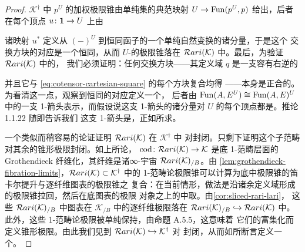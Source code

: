 \begin{proof}
$\mathcal{K}^{\dagger}$ 中\trCotensor{} $p^{U}$ 的加权极限锥由单纯集的典范映射
$U\to\operatorname{Fun}(p^{U},p)$
给出，后者在每个顶点 $u\colon\mathbf{1}\to U$ 上由
\begin{rveq}\label{eq:cotensor-cartesian-square}
\end{rveq}
诸映射 $u^{*}$ 定义从 $(-)^{U}$ 到恒同函子的一个单纯自然变换的诸分量，于是这个
交换方块的对应是一个恒同，从而 $U$-\trCotensor{}的极限锥落在 $\mathcal{R}ari(\mathcal{K})$
中。最后，为验证 $\mathcal{R}ari(\mathcal{K})$ 中\trCotensor{}的\trUniversalProperty{}，
我们必须证明：任何交换方块——其定义域 $q$ 是一支容有\trRightAdjoint{}右逆的%
\trIsofibration
\begin{center}
\end{center}
并且它与 \eqref{eq:cotensor-cartesian-square} 的每个方块复合均得\trExactSquare
——本身是正合的。为看清这一点，观察到恒同的对应定义一个\trNaturalTransformation{}，
后者由 $\operatorname{Fun}(A,E^{U})\cong\operatorname{Fun}(A,E)^{U}$ 中的一支 1-箭头表示，而假设说这支
1-箭头的诸分量对 $U$ 的每个顶点都是\trInvertible{}。推论 1.1.22 随即告诉我们
这支 1-箭头是\trInvertible{}，正如所求。

一个类似而稍容易的论证证明 $\mathcal{R}ari(\mathcal{K})$ 在 $\mathcal{K}^{\dagger}$ 中
对\trProduct{}封闭。只剩下证明这个子范畴对其余的锥形极限封闭。如上所论，
$\mathrm{cod}\colon\mathcal{R}ari(\mathcal{K})\to\mathcal{K}$ 是底 1-范畴层面的
Grothendieck 纤维化，其纤维是诸∞-宇宙 $\mathcal{R}ari(\mathcal{K})_{/B}$。由
\cref{lem:grothendieck-fibration-limits}，$\mathcal{R}ari(\mathcal{K})\subset\mathcal{K}^{\dagger}$
中的 1-范畴论极限锥可以计算为底中极限锥的笛卡尔提升与逐纤维图表的极限锥之
复合：在当前情形，做法是沿诸余定义域形成的极限锥拉回，然后在底图表的极限
对象之上的\trSliceInfinityCosmos{}中取\trLimit{}。由\cref{cor:sliced-rari-lari}，
这些 $\mathcal{R}ari(\mathcal{K})_{/B}$ 中图表在\trSliceInfinityCosmos{}
$\mathcal{K}_{/B}$ 中的逐纤维极限落在 $\mathcal{R}ari(\mathcal{K})_{/B}\hookrightarrow\mathcal{R}ari(\mathcal{K})$
中。此外，这些 1-范畴论极限被单纯\trCotensor{}保持，由命题 A.5.5，这意味着
它们的\trUniversalProperty{}富集化而定义锥形极限。由此我们见到
$\mathcal{R}ari(\mathcal{K})\hookrightarrow\mathcal{K}^{\dagger}$ 对%
\trFlexibleWeightedLimit{}封闭，从而如所断言定义一个\trCosmologicalEmbedding{}。
\end{proof}

